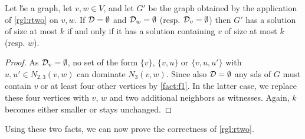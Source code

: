 \begin{fact}\label{fact:f2}
    Let \G be a graph, let $v,w \in V$, and let $G'$ be the graph obtained by the application of \cref{rgl:rtwo} on $v, w$. If $\mathcal{D} = \emptyset$ and $\mathcal{D}_{w} = \emptyset$ (resp. $\mathcal{D}_{v} = \emptyset$) then $G'$ has a solution of size at most $k$ if and only if it has a solution containing $v$ of size at most $k$ (resp. $w$).
\end{fact}
\begin{proof}
As $\mathcal{D}_{v} = \emptyset$, no set of the form $\{v\}$, $\{v, u\}$ or $\{v, u, u'\}$ with $u, u' \in N_{2,3}(v,w)$ can dominate $N_3(v,w)$. 
Since also $\mathcal{D} = \emptyset$ any sds of $G$ must contain $v$ or at least four other vertices by \cref{fact:f1}.
In the latter case, we replace these four vertices with $v$, $w$ and two additional neighbors as witnesses.
Again, $k$ becomes either smaller or stays unchanged.
\end{proof}

Using these two facts, we can now prove the correctness of \cref{rgl:rtwo}.

